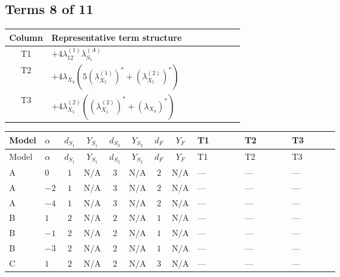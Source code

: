 \documentclass[8pt]{article}
\begin{document}
\begin{landscape}
\subsection*{Terms 8 of 11}
\begin{center}
\begin{tabular}{@{}c >{\raggedright\arraybackslash}p{0.82\linewidth}@{}}
\toprule
Column & Representative term structure \\
\midrule
T1 & \(\displaystyle +4 {\lambda_{12}^{(1)}} {\lambda_{S_1}^{(A)}}\) \\
\midrule
T2 & \(\displaystyle +4 {\lambda_{X_{9}}} (5 \left({\lambda_{X_{5}}^{(1)}}\right)^{*}+\left({\lambda_{X_{5}}^{(2)}}\right)^{*})\) \\
\midrule
T3 & \(\displaystyle +4 {\lambda_{X_{5}}^{(2)}} (\left({\lambda_{X_{5}}^{(2)}}\right)^{*}+\left({\lambda_{X_{9}}}\right)^{*})\) \\
\midrule
\bottomrule
\end{tabular}
\end{center}
\smallskip
\tiny
\begin{longtable}{@{}llcccccc >{\raggedright\arraybackslash}p{0.21\linewidth} >{\raggedright\arraybackslash}p{0.21\linewidth} >{\raggedright\arraybackslash}p{0.21\linewidth}@{}}
\toprule
Model & $\alpha$ & $d_{S_1}$ & $Y_{S_1}$ & $d_{S_2}$ & $Y_{S_2}$ & $d_F$ & $Y_F$ & T1 & T2 & T3 \\
\midrule
\endfirsthead
\toprule
Model & $\alpha$ & $d_{S_1}$ & $Y_{S_1}$ & $d_{S_2}$ & $Y_{S_2}$ & $d_F$ & $Y_F$ & T1 & T2 & T3 \\
\midrule
\endhead
A & $0$ & $1$ & $\text{N/A}$ & $3$ & $\text{N/A}$ & $2$ & $\text{N/A}$ & --- & --- & --- \\
\midrule
A & $-2$ & $1$ & $\text{N/A}$ & $3$ & $\text{N/A}$ & $2$ & $\text{N/A}$ & --- & --- & --- \\
\midrule
A & $-4$ & $1$ & $\text{N/A}$ & $3$ & $\text{N/A}$ & $2$ & $\text{N/A}$ & --- & --- & --- \\
\midrule
B & $1$ & $2$ & $\text{N/A}$ & $2$ & $\text{N/A}$ & $1$ & $\text{N/A}$ & --- & --- & --- \\
\midrule
B & $-1$ & $2$ & $\text{N/A}$ & $2$ & $\text{N/A}$ & $1$ & $\text{N/A}$ & --- & --- & --- \\
\midrule
B & $-3$ & $2$ & $\text{N/A}$ & $2$ & $\text{N/A}$ & $1$ & $\text{N/A}$ & --- & --- & --- \\
\midrule
C & $1$ & $2$ & $\text{N/A}$ & $2$ & $\text{N/A}$ & $3$ & $\text{N/A}$ & --- & --- & --- \\

\end{longtable}
\end{landscape}
\end{document}
